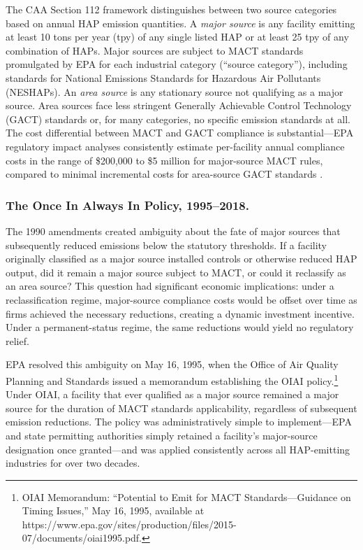 \documentclass[12pt]{article}
\begin{document}
The CAA Section 112 framework distinguishes between two source categories based on annual HAP emission quantities. A \emph{major source} is any facility emitting at least 10 tons per year (tpy) of any single listed HAP or at least 25 tpy of any combination of HAPs. Major sources are subject to MACT standards promulgated by EPA for each industrial category (``source category''), including standards for National Emissions Standards for Hazardous Air Pollutants (NESHAPs). An \emph{area source} is any stationary source not qualifying as a major source. Area sources face less stringent Generally Achievable Control Technology (GACT) standards or, for many categories, no specific emission standards at all. The cost differential between MACT and GACT compliance is substantial---EPA regulatory impact analyses consistently estimate per-facility annual compliance costs in the range of \$200,000 to \$5 million for major-source MACT rules, compared to minimal incremental costs for area-source GACT standards \citep{EPA2019MACT}.

\subsubsection*{The Once In Always In Policy, 1995--2018.}
The 1990 amendments created ambiguity about the fate of major sources that subsequently reduced emissions below the statutory thresholds. If a facility originally classified as a major source installed controls or otherwise reduced HAP output, did it remain a major source subject to MACT, or could it reclassify as an area source? This question had significant economic implications: under a reclassification regime, major-source compliance costs would be offset over time as firms achieved the necessary reductions, creating a dynamic investment incentive. Under a permanent-status regime, the same reductions would yield no regulatory relief.

EPA resolved this ambiguity on May 16, 1995, when the Office of Air Quality Planning and Standards issued a memorandum establishing the OIAI policy.\footnote{OIAI Memorandum: ``Potential to Emit for MACT Standards---Guidance on Timing Issues,'' May 16, 1995, available at https://www.epa.gov/sites/production/files/2015-07/documents/oiai1995.pdf.} Under OIAI, a facility that ever qualified as a major source remained a major source for the duration of MACT standards applicability, regardless of subsequent emission reductions. The policy was administratively simple to implement---EPA and state permitting authorities simply retained a facility's major-source designation once granted---and was applied consistently across all HAP-emitting industries for over two decades.
\end{document}
